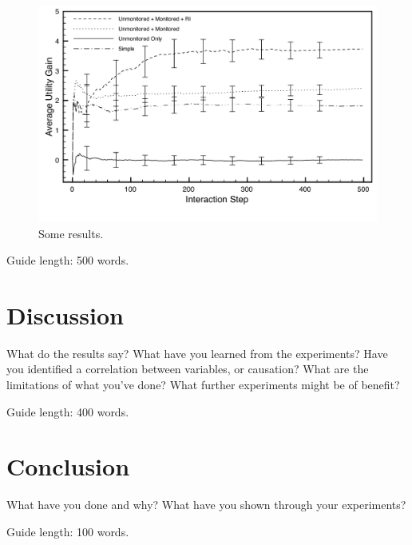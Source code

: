 \documentclass{csfourzero}
\begin{document}
\begin{figure}
\centerline{\includegraphics[width=5in]{basic-data-errors}}
\caption{Some results.}
\label{fig:data}
\end{figure}

Guide length: 500 words.

\section{Discussion}
\label{sec:discuss}

What do the results say? What have you learned from the
experiments? Have you identified a correlation between variables, or
causation? What are the limitations of what you've done? What further
experiments might be of benefit?

Guide length: 400 words.

\section{Conclusion}
\label{sec:conc}

What have you done and why? What have you shown through your
experiments?

Guide length: 100 words.


\end{document}
